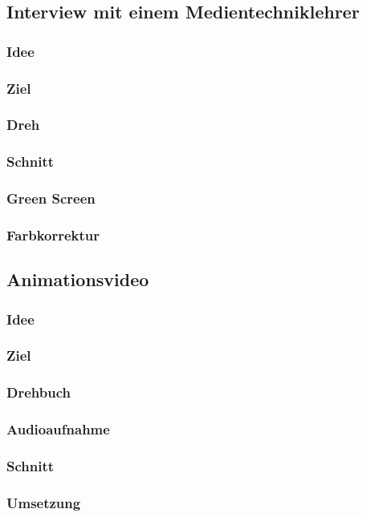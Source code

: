 \subsection{Interview mit einem Medientechniklehrer}
\subsubsection{Idee}
\subsubsection{Ziel}
\subsubsection{Dreh}
\subsubsection{Schnitt}
\subsubsection{Green Screen}
\subsubsection{Farbkorrektur}
\subsection{Animationsvideo}
\subsubsection{Idee}
\subsubsection{Ziel}
\subsubsection{Drehbuch}
\subsubsection{Audioaufnahme}
\subsubsection{Schnitt}
\subsubsection{Umsetzung}